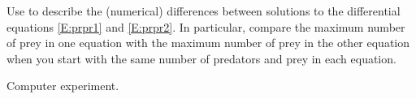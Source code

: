 \documentclass{ximera}
\begin{document}
\begin{exercise} \label{c9.1.7}
Use {\pplane} to describe the (numerical) differences between solutions 
to the differential equations \eqref{E:prpr1} and \eqref{E:prpr2}.  In particular,
compare the maximum number of prey in one equation with the maximum number of 
prey in the other equation when you start with the same number of predators 
and prey in each equation.

\begin{solution}
Computer experiment.


\end{solution}
\end{exercise}
\end{document}
